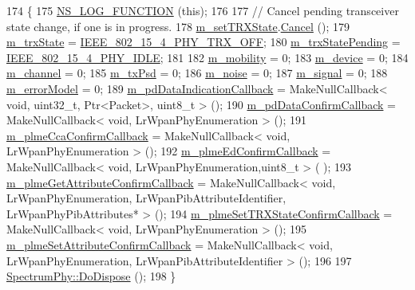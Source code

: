 \begin{DoxyCode}
174 \{
175   \hyperlink{log-macros-disabled_8h_a90b90d5bad1f39cb1b64923ea94c0761}{NS\_LOG\_FUNCTION} (\textcolor{keyword}{this});
176 
177   \textcolor{comment}{// Cancel pending transceiver state change, if one is in progress.}
178   \hyperlink{classns3_1_1LrWpanPhy_a0b82e7f96d0225c83489cf3dfb6058ce}{m\_setTRXState}.\hyperlink{classns3_1_1EventId_a993ae94e48e014e1afd47edb16db7a11}{Cancel} ();
179   \hyperlink{classns3_1_1LrWpanPhy_a316704a4eb96e04f4b960ba3577fe0ce}{m\_trxState} = \hyperlink{group__lr-wpan_gga6494269d13d45c511a07b7ccbb1de754a4c0fd3882b68301deb8ce5b03109058f}{IEEE\_802\_15\_4\_PHY\_TRX\_OFF};
180   \hyperlink{classns3_1_1LrWpanPhy_a84647014f5242767e3358a6a851c81a7}{m\_trxStatePending} = \hyperlink{group__lr-wpan_gga6494269d13d45c511a07b7ccbb1de754af3994414efcd2fac7e312ecb9b3ebd70}{IEEE\_802\_15\_4\_PHY\_IDLE};
181 
182   \hyperlink{classns3_1_1LrWpanPhy_a746dc7299fae28fafa617075ca3b5433}{m\_mobility} = 0;
183   \hyperlink{classns3_1_1LrWpanPhy_a406001d3cb4da3828837c1c1b4629a9c}{m\_device} = 0;
184   \hyperlink{classns3_1_1LrWpanPhy_a6ea4a904afe3b256bc001c40efe496e1}{m\_channel} = 0;
185   \hyperlink{classns3_1_1LrWpanPhy_a136f3eddb97dc50b4689df6a36df1f76}{m\_txPsd} = 0;
186   \hyperlink{classns3_1_1LrWpanPhy_a02560969747aa24f7bded61743f5cc37}{m\_noise} = 0;
187   \hyperlink{classns3_1_1LrWpanPhy_a923130b0bacef678012bcc8fdc68fd10}{m\_signal} = 0;
188   \hyperlink{classns3_1_1LrWpanPhy_a51ab23fe176708768b6276cdbbd68a06}{m\_errorModel} = 0;
189   \hyperlink{classns3_1_1LrWpanPhy_a94de3241a0050cc21f5a57fdbc951c9e}{m\_pdDataIndicationCallback} = MakeNullCallback< void, uint32\_t, Ptr<Packet>, 
      uint8\_t > ();
190   \hyperlink{classns3_1_1LrWpanPhy_a6f736d7cb72829ef100315c1b8f6ea05}{m\_pdDataConfirmCallback} = MakeNullCallback< void, LrWpanPhyEnumeration > ();
191   \hyperlink{classns3_1_1LrWpanPhy_a3b75b533222419589c396380e8305bb9}{m\_plmeCcaConfirmCallback} = MakeNullCallback< void, LrWpanPhyEnumeration > ();
192   \hyperlink{classns3_1_1LrWpanPhy_a5cf7d4aaf1889772a711a2e83fb39eca}{m\_plmeEdConfirmCallback} = MakeNullCallback< void, LrWpanPhyEnumeration,uint8\_t > (
      );
193   \hyperlink{classns3_1_1LrWpanPhy_abc174686fae5652243dca022df5af6ed}{m\_plmeGetAttributeConfirmCallback} = MakeNullCallback< void,
       LrWpanPhyEnumeration, LrWpanPibAttributeIdentifier, LrWpanPhyPibAttributes* > ();
194   \hyperlink{classns3_1_1LrWpanPhy_ab3fed0e994f9e51e765c704f1a7b666f}{m\_plmeSetTRXStateConfirmCallback} = MakeNullCallback< void,
       LrWpanPhyEnumeration > ();
195   \hyperlink{classns3_1_1LrWpanPhy_a174646782f62d874a5c92f4cfbbb8922}{m\_plmeSetAttributeConfirmCallback} = MakeNullCallback< void,
       LrWpanPhyEnumeration, LrWpanPibAttributeIdentifier > ();
196 
197   \hyperlink{classns3_1_1Object_a475d429a75d302d4775f4ae32479b287}{SpectrumPhy::DoDispose} ();
198 \}
\end{DoxyCode}



